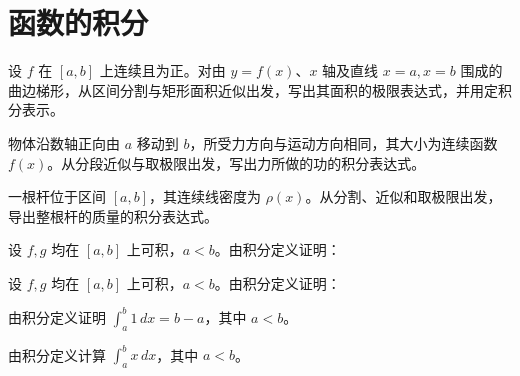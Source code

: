 \renewcommand{\thesection}{\arabic{section}}\renewcommand{\theHsection}{chapter.\arabic{section}}\setcounter{section}{5}\section{函数的积分}
\noindent\begin{minipage}{\textwidth}
设 $f$ 在 $[a,b]$ 上连续且为正。对由 $y=f(x)$、$x$ 轴及直线 $x=a,x=b$ 围成的曲边梯形，从区间分割与矩形面积近似出发，写出其面积的极限表达式，并用定积分表示。
\end{minipage}\par\vfill
\noindent\begin{minipage}{\textwidth}
物体沿数轴正向由 $a$ 移动到 $b$，所受力方向与运动方向相同，其大小为连续函数 $f(x)$。从分段近似与取极限出发，写出力所做的功的积分表达式。
\end{minipage}\par\vfill
\noindent\begin{minipage}{\textwidth}
一根杆位于区间 $[a,b]$，其连续线密度为 $\rho(x)$。从分割、近似和取极限出发，导出整根杆的质量的积分表达式。
\end{minipage}\par\vfill
\newpage
\noindent\begin{minipage}{\textwidth}
设 $f,g$ 均在 $[a,b]$ 上可积，$a<b$。由积分定义证明：
\end{minipage}\par\vfill
\noindent\begin{minipage}{\textwidth}
设 $f,g$ 均在 $[a,b]$ 上可积，$a<b$。由积分定义证明：
\end{minipage}\par\vfill
\noindent\begin{minipage}{\textwidth}
由积分定义证明 $\int_a^b1\,dx=b-a$，其中 $a<b$。
\end{minipage}\par\vfill
\newpage
\noindent\begin{minipage}{\textwidth}
由积分定义计算 $\int_a^b x\,dx$，其中 $a<b$。
\end{minipage}\par\vfill
